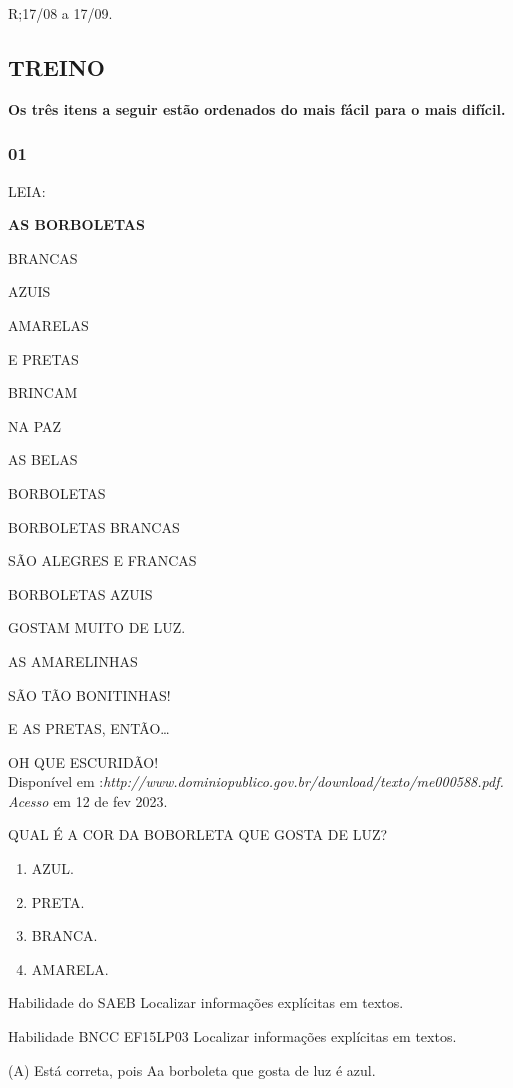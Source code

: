 R;17/08 a 17/09.

\subsection{TREINO}\label{treino-2}

\textbf{Os três itens a seguir estão ordenados do mais fácil para o mais
difícil. }

\subsubsection{01}\label{section-8}

LEIA:

\textbf{AS BORBOLETAS}

BRANCAS

AZUIS

AMARELAS

E PRETAS

BRINCAM

NA PAZ

AS BELAS

BORBOLETAS

BORBOLETAS BRANCAS

SÃO ALEGRES E FRANCAS

BORBOLETAS AZUIS

GOSTAM MUITO DE LUZ.

AS AMARELINHAS

SÃO TÃO BONITINHAS!

E AS PRETAS, ENTÃO\ldots{}

OH QUE ESCURIDÃO!\\
Disponível em
:\emph{http://www.dominiopublico.gov.br/download/texto/me000588.pdf.
Acesso} em 12 de fev 2023.

QUAL É A COR DA BOBORLETA QUE GOSTA DE LUZ?

\begin{enumerate}
\def\labelenumi{\Alph{enumi})}
\item
  AZUL.
\item
  PRETA.
\item
  BRANCA.
\item
  AMARELA.
\end{enumerate}

\protect\hypertarget{_heading=h.z337ya}{}{}Habilidade do SAEB Localizar
informações explícitas em textos.

Habilidade BNCC EF15LP03 Localizar informações explícitas em textos.

(A) Está correta, pois Aa borboleta que gosta de luz é azul.

